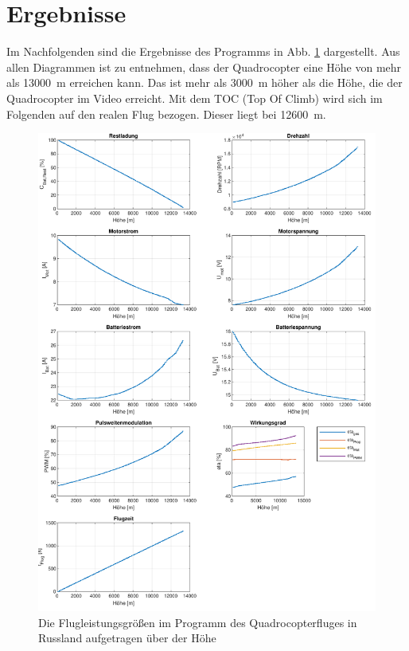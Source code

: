 \section{Ergebnisse}
\label{sec:ergebnisse_quadrocopter}

Im Nachfolgenden sind die Ergebnisse des Programms in Abb. \ref{abb:ergebnisse_russland} dargestellt. Aus allen Diagrammen ist zu entnehmen, dass der Quadrocopter eine Höhe von mehr als \SI{13000}{m} erreichen kann. Das ist mehr als \SI{3000}{m} höher als die Höhe, die der Quadrocopter im Video erreicht. Mit dem TOC (Top Of Climb) wird sich im Folgenden auf den realen Flug bezogen. Dieser liegt bei \SI{12600}{m}.\\
\begin{figure}[H]
\centering
	\includegraphics[scale=0.7]{Diagramme/Russland.pdf}
	\caption{Die Flugleistungsgrößen im Programm des Quadrocopterfluges in Russland aufgetragen über der Höhe}
	\label{abb:ergebnisse_russland}
\end{figure}
